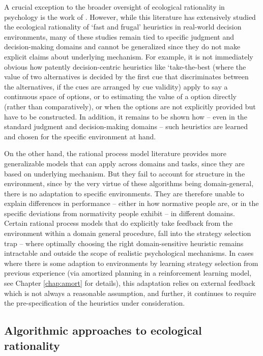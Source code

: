 A crucial exception to the broader oversight of ecological rationality in psychology is the work of \citep{gigerenzer2008heuristics}. However, while this literature has extensively studied the ecological rationality of `fast and frugal' heuristics in real-world decision environments, many of these studies remain tied to specific judgment and decision-making domains and cannot be generalized since they do not make explicit claims about underlying mechanism. For example, it is not immediately obvious how patently decision-centric heuristics like `take-the-best (where the value of two alternatives is decided by the first cue that discriminates between the alternatives, if the cues are arranged by cue validity) apply to say a continuous space of options, or to estimating the value of a option directly (rather than comparatively), or when the options are not explicitly provided but have to be constructed. In addition, it remains to be shown how -- even in the standard judgment and decision-making domains -- such heuristics are learned and chosen for the specific environment at hand. 

On the other hand, the rational process model literature provides more generalizable models that can apply across domains and tasks, since they are based on underlying mechanism. But they fail to account for structure in the environment, since by the very virtue of these algorithms being domain-general, there is no adaptation to specific environments. They are therefore unable to explain differences in performance -- either in how normative people are, or in the specific deviations from normativity people exhibit -- in different domains. Certain rational process models that do explicitly take feedback from the environment within a domain general procedure, fall into the strategy selection trap -- where optimally choosing the right domain-sensitive heuristic remains intractable and outside the scope of realistic psychological mechanisms. In cases where there is some adaption to environments by learning strategy selection from previous experience (via amortized planning in a reinforcement learning model, see Chapter \ref{chap:amort} for details), this adaptation relies on external feedback which is not always a reasonable assumption, and further, it continues to require the pre-specification of the heuristics under consideration.

\subsection{Algorithmic approaches to ecological rationality}


